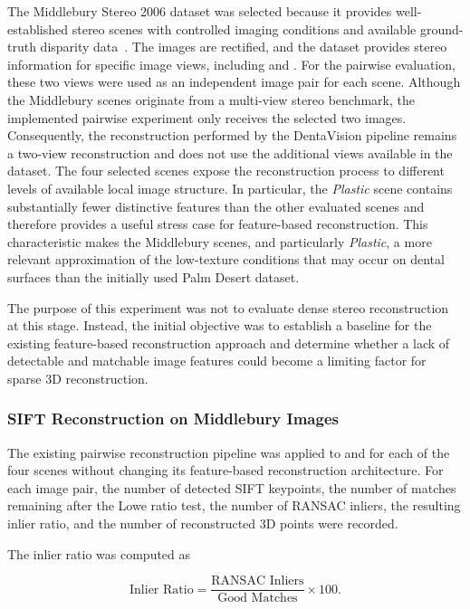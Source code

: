 The Middlebury Stereo 2006 dataset was selected because it provides
well-established stereo scenes with controlled imaging conditions and
available ground-truth disparity data~\cite{scharstein2007learning,hirschmuller2007evaluation}.
The images are rectified, and the dataset provides stereo information for
specific image views, including  and .
For the pairwise evaluation, these two views were used as an independent image
pair for each scene. Although the Middlebury scenes originate from a
multi-view stereo benchmark, the implemented pairwise experiment only receives
the selected two images. Consequently, the reconstruction performed by the
DentaVision pipeline remains a two-view reconstruction and does not use the
additional views available in the dataset.
The four selected scenes expose the reconstruction process to different levels
of available local image structure. In particular, the \textit{Plastic} scene
contains substantially fewer distinctive features than the other evaluated
scenes and therefore provides a useful stress case for feature-based
reconstruction. This characteristic makes the Middlebury scenes, and particularly
\textit{Plastic}, a more relevant approximation of the low-texture conditions
that may occur on dental surfaces than the initially used Palm Desert dataset.

The purpose of this experiment was not to evaluate dense stereo reconstruction
at this stage. Instead, the initial objective was to establish a baseline for
the existing feature-based reconstruction approach and determine whether a
lack of detectable and matchable image features could become a limiting factor
for sparse 3D reconstruction.

\subsubsection{SIFT Reconstruction on Middlebury Images}

The existing pairwise reconstruction pipeline was applied to
 and  for each of the four scenes without
changing its feature-based reconstruction architecture. For each image pair,
the number of detected SIFT keypoints, the number of matches remaining after
the Lowe ratio test, the number of RANSAC inliers, the resulting inlier ratio,
and the number of reconstructed 3D points were recorded.

The inlier ratio was computed as

\begin{equation}
\text{Inlier Ratio} =
\frac{\text{RANSAC Inliers}}
{\text{Good Matches}}
\times 100.
\end{equation}

